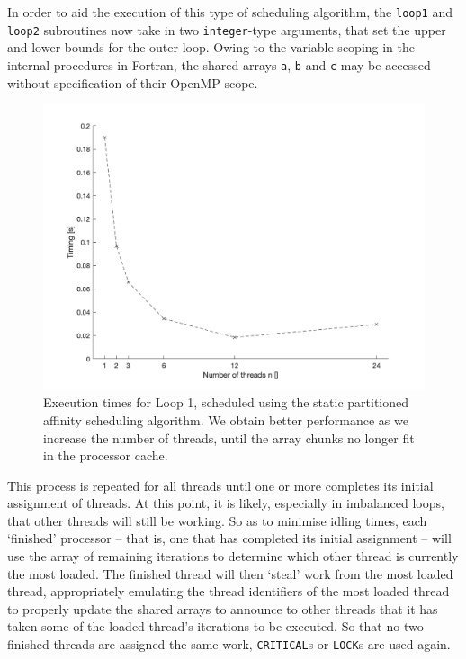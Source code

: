 \documentclass{article} %
\newcommand{\tp}{\texttt}
\begin{document}
In order to aid the execution of this type of scheduling algorithm, the \tp{loop1} and \tp{loop2} subroutines now take in two \tp{integer}-type arguments, that set the upper and lower bounds for the outer loop.
Owing to the variable scoping in the internal procedures in Fortran, the shared arrays \tp{a}, \tp{b} and \tp{c} may be accessed without specification of their OpenMP scope.

\begin{figure}
    \centering
    \includegraphics[height=.3\textheight]{part2_plots/affinity_loop1}
    \caption{Execution times for Loop 1, scheduled using the static partitioned affinity scheduling algorithm. We obtain better performance as we increase the number of threads, until the array chunks no longer fit in the processor cache.}
    \label{fig:affinityloop1}
\end{figure}

This process is repeated for all threads until one or more completes its initial assignment of threads.
At this point, it is likely, especially in imbalanced loops, that other threads will still be working.
So as to minimise idling times, each `finished' processor -- that is, one that has completed its initial assignment -- will use the array of remaining iterations to determine which other thread is currently the most loaded.
The finished thread will then `steal' work from the most loaded thread, appropriately emulating the thread identifiers of the most loaded thread to properly update the shared arrays to announce to other threads that it has taken some of the loaded thread's iterations to be executed.
So that no two finished threads are assigned the same work, \tp{CRITICAL}s or \tp{LOCK}s are used again.
\end{document}
